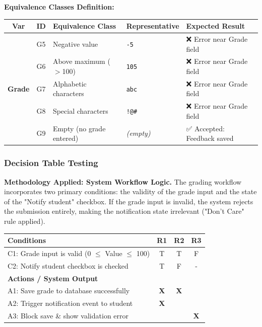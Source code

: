 \documentclass[twoside,final]{hcmut-report}
\begin{document}
\vspace{0.3cm}
\noindent\textbf{Equivalence Classes Definition:}
\begin{table}[H]
\centering
\renewcommand{\arraystretch}{1.2}
\begin{tabularx}{\textwidth}{|c|l|X|l|X|}
\hline
\textbf{Var} & \textbf{ID} & \textbf{Equivalence Class} & \textbf{Representative} & \textbf{Expected Result} \\ \hline
\multirow{5}{*}{\textbf{Grade}}
& G5 & Negative value & \texttt{-5} & ❌ Error near Grade field \\ \cline{2-5}
& G6 & Above maximum ($>$100) & \texttt{105} & ❌ Error near Grade field \\ \cline{2-5}
& G7 & Alphabetic characters & \texttt{abc} & ❌ Error near Grade field \\ \cline{2-5}
& G8 & Special characters & \texttt{!@\#} & ❌ Error near Grade field \\ \cline{2-5}
& G9 & Empty (no grade entered) & \textit{(empty)} & ✅ Accepted: Feedback saved \\ \hline
\end{tabularx}
\end{table}

\subsubsection{Decision Table Testing}
\textbf{Methodology Applied: System Workflow Logic.} 
The grading workflow incorporates two primary conditions: the validity of the grade input and the state of the "Notify student" checkbox. If the grade input is invalid, the system rejects the submission entirely, making the notification state irrelevant ("Don't Care" rule applied).

\begin{table}[H]
\centering
\renewcommand{\arraystretch}{1.2}
\begin{tabularx}{\textwidth}{|>{\raggedright\arraybackslash}X|c|c|c|}
\hline
\textbf{Conditions} & \textbf{R1} & \textbf{R2} & \textbf{R3} \\ \hline
C1: Grade input is valid (0 $\le$ Value $\le$ 100) & T & T & F \\ \hline
C2: Notify student checkbox is checked & T & F & - \\ \hline
\hline
\textbf{Actions / System Output} & & & \\ \hline
A1: Save grade to database successfully & \textbf{X} & \textbf{X} & \\ \hline
A2: Trigger notification event to student & \textbf{X} & & \\ \hline
A3: Block save \& show validation error & & & \textbf{X} \\ \hline
\end{tabularx}
\end{table}
\end{document}
